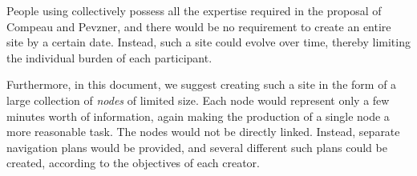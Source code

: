 People using \commonlisp{} collectively possess all the expertise
required in the proposal of Compeau and Pevzner, and there would be no
requirement to create an entire site by a certain date.  Instead, such
a site could evolve over time, thereby limiting the individual burden
of each participant.

Furthermore, in this document, we suggest creating such a site in the
form of a large collection of \emph{nodes} of limited size.  Each node
would represent only a few minutes worth of information, again making
the production of a single node a more reasonable task.  The nodes
would not be directly linked.  Instead, separate navigation plans
would be provided, and several different such plans could be created,
according to the objectives of each creator.
